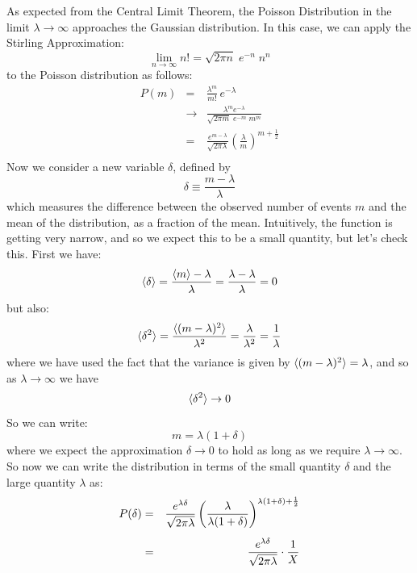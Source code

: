 \documentclass[12pt,oneside]{book}
\begin{document}
As expected from the Central Limit Theorem, the Poisson Distribution in the limit $\lambda \to \infty$
approaches the Gaussian distribution.  In this case, we can apply the Stirling Approximation:
\begin{displaymath}
\lim_{n \to \infty} n! = \sqrt{2 \pi n} \; e^{-n} \; n^n
\end{displaymath}
to the Poisson distribution as follows:
\begin{eqnarray*}
P(m) &=& \frac{\lambda^m}{m!} \, e^{-\lambda} \\[5pt]
 &\to& \frac{\lambda^m e^{-\lambda}}{\sqrt{2 \pi m} \; e^{-m} \; m^m} \\[5pt]
 &=& \frac{e^{m-\lambda}}{\sqrt{2\pi\lambda}} \left( \frac{\lambda}{m}\right)^{m+\frac{1}{2}}\\
\end{eqnarray*}
Now we consider a new variable $\delta$, defined by
\begin{displaymath}
\delta \equiv \frac{m-\lambda}{\lambda}
\end{displaymath}
which measures the difference between the observed number of events $m$ and the mean of the distribution, as a fraction of the mean.  Intuitively, the function is getting very narrow, and so we expect this to be a small quantity, but let's check this.  First we have:
\begin{displaymath}
\braket{\delta} = \frac{\braket{m}- \lambda}{\lambda} = \frac{\lambda - \lambda}{\lambda} = 0
\end{displaymath}
but also:
\begin{displaymath}
\braket{\delta^2} = \frac{\braket{(m-\lambda)^2}}{\lambda^2} = \frac{\lambda}{\lambda^2} = \frac{1}{\lambda}
\end{displaymath}
where we have used the fact that the variance is given by $\braket{(m-\lambda)^2} = \lambda$, and so as $\lambda \to \infty $ we have
\begin{displaymath}
\braket{\delta^2} \to 0
\end{displaymath}
So we can write:
\begin{equation} \label{eqn:mdef}
m = \lambda (1 + \delta)
\end{equation}
where we expect the approximation $\delta \to 0$ to hold as long as we require $\lambda \to \infty$.  So now we can write the distribution in terms of the small quantity $\delta$ and the large quantity $\lambda$ as:
\begin{eqnarray}
\label{eqn:pdelt}
P(\delta) &=& \frac{e^{\lambda\delta}}{\sqrt{2\pi\lambda}} \left( \frac{\lambda}{\lambda (1+\delta)} \right)^{\lambda(1+\delta)+\frac{1}{2}} \notag \\[5pt]
 &=& \frac{e^{\lambda\delta}}{\sqrt{2\pi\lambda}} \cdot \frac{1}{X}
\end{eqnarray}
\end{document}
